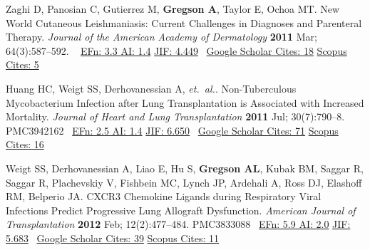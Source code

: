 \documentclass[letterpaper,10pt,sans,dvipsnames,final]{moderncv}%
\begin{document}
\begin{thebibliography}{1}
  \bibitem[17]{} Zaghi D, Panosian C, Gutierrez M, \textbf{Gregson A}, Taylor E, Ochoa MT. New World Cutaneous Leishmaniasis: Current Challenges in Diagnoses and Parenteral Therapy. {\color{BrickRed}\textit{Journal of the American Academy of Dermatology}} \textbf{2011} Mar; 64(3):587--592. \href{http://dx.doi.org/10.1016/j.jaad.2009.08.045}{\aiDoi}~ 
    {\color{NavyBlue} \href{http://www.eigenfactor.org/detail.php?year=2008&jrlname=J%20AM%20ACAD%20DERMATOL&issnnum=0190-9622}{{\smaller EFn: 3.3 AI: 1.4}} 
        \href{http://admin-apps.webofknowledge.com/JCR/JCR?RQ=RECORD&rank=1&journal=J+AM+ACAD+DERMATOL}{{\smaller JIF: 4.449}}~ 
        \href{https://scholar.google.com/scholar?oi=bibs&hl=en&cites=4429934093446128267}{{\smaller Google Scholar Cites: 18}}
        \href{http://www.scopus.com/record/display.url?eid=2-s2.0-79951580535&origin=inward&txGid=2728424DD3A06399B3857C04F09A7B4B.N5T5nM1aaTEF8rE6yKCR3A%3a8}{{\smaller Scopus Cites: 5}}
        } 

  \bibitem[18]{} Huang HC, Weigt SS, Derhovanessian A, \textit{et.\ al.}. Non-Tuberculous Mycobacterium Infection after Lung Transplantation is Associated with Increased Mortality. {\color{BrickRed}\textit{Journal of Heart and Lung Transplantation}} \textbf{2011} Jul; 30(7):790--8. \href{http://dx.doi.org/10.1016/j.healun.2011.02.007}{\aiDoi} {\smaller PMC3942162}~ 
    {\color{NavyBlue} \href{http://www.eigenfactor.org/rankings.php?search=JOURNAL+OF+HEART+AND+LUNG+TRANSPLANTATION&search2=&search3=&searchby=journal}{{\smaller EFn: 2.5 AI: 1.4}}
      \href{http://admin-apps.webofknowledge.com/JCR/JCR?RQ=RECORD&rank=1&journal=J+HEART+LUNG+TRANSPL}{{\smaller JIF: 6.650}}~
      \href{https://scholar.google.com/scholar?oi=bibs&hl=en&cites=9233036861114044918}{{\smaller Google Scholar Cites: 71}}
       \href{http://www.scopus.com/record/display.url?eid=2-s2.0-79959232329&origin=inward&txGid=2728424DD3A06399B3857C04F09A7B4B.N5T5nM1aaTEF8rE6yKCR3A%3a6}{{\smaller Scopus Cites: 16}}
    }

  \bibitem[19]{} Weigt SS, Derhovanessian A, Liao E, Hu S, \textbf{Gregson AL}, Kubak BM, Saggar R, Saggar R, Plachevskiy V, Fishbein MC, Lynch JP, Ardehali A, Ross DJ, Elashoff RM, Belperio JA. {\smaller CXCR}3 Chemokine Ligands during Respiratory Viral Infections Predict Progressive Lung Allograft Dysfunction. {\color{BrickRed}\textit{American Journal of Transplantation}} \textbf{2012} Feb; 12(2):477--484. \href{http://dx.doi.org/10.1111/j.1600-6143.2011.03859.x}{\aiDoi} {\smaller PMC3833088}~
           {\color{NavyBlue}\href{http://52.6.43.8/projects/journalRank/rankings.php?bsearch=AMERICAN+JOURNAL+OF+TRANSPLANTATION&searchby=journal&orderby=eigenfactor}{{\smaller EFn: 5.9 AI: 2.0}} 
             \href{http://admin-apps.webofknowledge.com/JCR/JCR?RQ=RECORD&rank=1&journal=AM+J+TRANSPLANT}{{\smaller JIF: 5.683}}~
             \href{https://scholar.google.com/scholar?oi=bibs&hl=en&cites=3801165577084038713}{{\smaller Google Scholar Cites: 39}}
       \href{http://www.scopus.com/record/display.url?eid=2-s2.0-84856469808&origin=inward&txGid=2728424DD3A06399B3857C04F09A7B4B.N5T5nM1aaTEF8rE6yKCR3A%3a2}{{\smaller Scopus Cites: 11}}
       }


\end{thebibliography}
\end{document}
